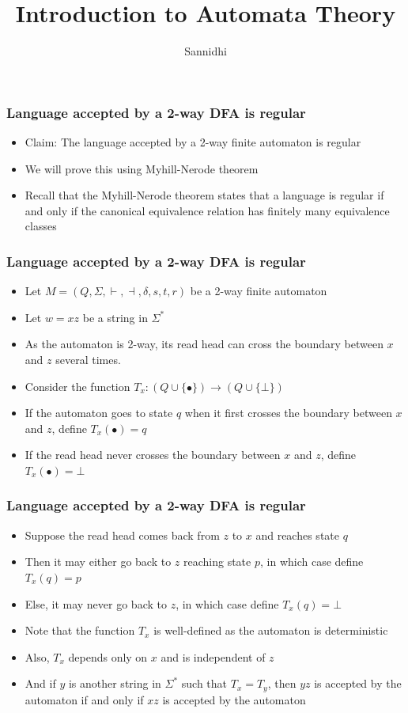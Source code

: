 \documentclass{beamer}
\title{Introduction to Automata Theory}
\author{Sannidhi}
\institute{IISc Bangalore}
\begin{document}
\begin{frame}
\frametitle{Language accepted by a 2-way DFA is regular}
\begin{itemize}
\item Claim: The language accepted by a 2-way finite automaton is regular
\item We will prove this using Myhill-Nerode theorem
\item Recall that the Myhill-Nerode theorem states that a language is regular if and only if the canonical equivalence relation has finitely many equivalence classes
\end{itemize}
\end{frame}

\begin{frame}
\frametitle{Language accepted by a 2-way DFA is regular}
\begin{itemize}
\item Let $M = (Q, \Sigma, \vdash, \dashv, \delta, s, t, r)$ be a 2-way finite automaton
\item Let $w = xz$ be a string in $\Sigma^*$
\item As the automaton is 2-way, its read head can cross the boundary between $x$ and $z$ several times.
\item Consider the function $T_x : (Q\cup\{\bullet\}) \rightarrow (Q\cup\{\bot\})$
\item If the automaton goes to state $q$ when it first crosses the boundary between $x$ and $z$, define $T_x(\bullet) = q$
\item If the read head never crosses the boundary between $x$ and $z$, define $T_x(\bullet) = \bot$
\end{itemize}
\end{frame}

\begin{frame}
\frametitle{Language accepted by a 2-way DFA is regular}
\begin{itemize}
\item Suppose the read head comes back from $z$ to $x$ and reaches state $q$
\item Then it may either go back to $z$ reaching state $p$, in which case define $T_x(q) = p$
\item Else, it may never go back to $z$, in which case define $T_x(q) = \bot$
\item Note that the function $T_x$ is well-defined as the automaton is deterministic
\item Also, $T_x$ depends only on $x$ and is independent of $z$
\item And if $y$ is another string in $\Sigma^*$ such that $T_x = T_y$, then $yz$ is accepted by the automaton if and only if $xz$ is accepted by the automaton
\end{itemize}
\end{frame}
\end{document}
